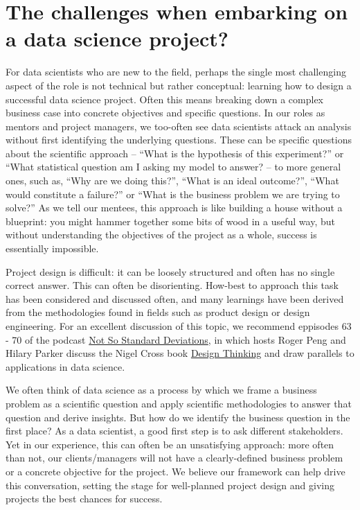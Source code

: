 \documentclass[
]{book}
\begin{document}
\hypertarget{the-challenges-when-embarking-on-a-data-science-project}{%
\section{The challenges when embarking on a data science project?}\label{the-challenges-when-embarking-on-a-data-science-project}}

For data scientists who are new to the field, perhaps the single most challenging aspect of the role is not technical but rather conceptual: learning how to design a successful data science project. Often this means breaking down a complex business case into concrete objectives and specific questions. In our roles as mentors and project managers, we too-often see data scientists attack an analysis without first identifying the underlying questions. These can be specific questions about the scientific approach -- ``What is the hypothesis of this experiment?'' or ``What statistical question am I asking my model to answer? -- to more general ones, such as, ``Why are we doing this?'', ``What is an ideal outcome?'', ``What would constitute a failure?'' or ``What is the business problem we are trying to solve?'' As we tell our mentees, this approach is like building a house without a blueprint: you might hammer together some bits of wood in a useful way, but without understanding the objectives of the project as a whole, success is essentially impossible.

Project design is difficult: it can be loosely structured and often has no single correct answer. This can often be disorienting. How-best to approach this task has been considered and discussed often, and many learnings have been derived from the methodologies found in fields such as product design or design engineering. For an excellent discussion of this topic, we recommend eppisodes 63 - 70 of the podcast \href{http://nssdeviations.com/}{Not So Standard Deviations}, in which hosts Roger Peng and Hilary Parker discuss the Nigel Cross book \href{https://www.amazon.co.uk/Design-Thinking-Understanding-Designers-Blac14/dp/1847886361/ref=sr_1_2?keywords=Nigel+Cross+book+Design+Thinking\&qid=1576333690\&sr=8-2}{Design Thinking} and draw parallels to applications in data science.

We often think of data science as a process by which we frame a business problem as a scientific question and apply scientific methodologies to answer that question and derive insights. But how do we identify the business question in the first place? As a data scientist, a good first step is to ask different stakeholders. Yet in our experience, this can often be an unsatisfying approach: more often than not, our clients/managers will not have a clearly-defined business problem or a concrete objective for the project. We believe our framework can help drive this conversation, setting the stage for well-planned project design and giving projects the best chances for success.
\end{document}
